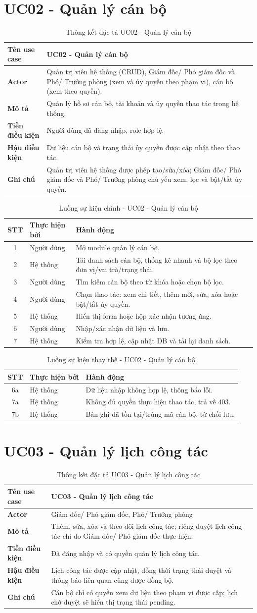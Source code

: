 \documentclass[18pt,a4paper]{report}
\newcommand{\specinfo}[6]{
\begin{table}[H]
\centering
\caption{Thông kết đặc tả #1}
\begin{tabularx}{\textwidth}{|>{\raggedright\arraybackslash}p{3.2cm}|X|}
\hline
\textbf{Tên use case} & #1 \\ \hline
\textbf{Actor} & #2 \\ \hline
\textbf{Mô tả} & #3 \\ \hline
\textbf{Tiền điều kiện} & #4 \\ \hline
\textbf{Hậu điều kiện} & #5 \\ \hline
\textbf{Ghi chú} & #6 \\ \hline
\end{tabularx}
\end{table}
}
\newcommand{\mainflowtable}[1]{
\begin{table}[H]
\centering
\caption{Luồng sự kiện chính - #1}
\begin{tabularx}{\textwidth}{|c|>{\raggedright\arraybackslash}p{3cm}|X|}
\hline
\textbf{STT} & \textbf{Thực hiện bởi} & \textbf{Hành động} \\ \hline
}
\newcommand{\altflowtable}[1]{
\begin{table}[H]
\centering
\caption{Luồng sự kiện thay thế - #1}
\begin{tabularx}{\textwidth}{|c|>{\raggedright\arraybackslash}p{3cm}|X|}
\hline
\textbf{STT} & \textbf{Thực hiện bởi} & \textbf{Hành động} \\ \hline
}
\begin{document}
\section{UC02 - Quản lý cán bộ}
\specinfo
{UC02 - Quản lý cán bộ}
{Quản trị viên hệ thống (CRUD), Giám đốc/ Phó giám đốc và Phó/ Trưởng phòng (xem và ủy quyền theo phạm vi), cán bộ (xem theo quyền).}
{Quản lý hồ sơ cán bộ, tài khoản và ủy quyền thao tác trong hệ thống.}
{Người dùng đã đăng nhập, role hợp lệ.}
{Dữ liệu cán bộ và trạng thái ủy quyền được cập nhật theo thao tác.}
{Quản trị viên hệ thống được phép tạo/sửa/xóa; Giám đốc/ Phó giám đốc và Phó/ Trưởng phòng chủ yếu xem, lọc và bật/tắt ủy quyền.}

\mainflowtable{UC02 - Quản lý cán bộ}
1 & Người dùng & Mở module quản lý cán bộ. \\ \hline
2 & Hệ thống & Tải danh sách cán bộ, thống kê nhanh và bộ lọc theo đơn vị/vai trò/trạng thái. \\ \hline
3 & Người dùng & Tìm kiếm cán bộ theo từ khóa hoặc chọn bộ lọc. \\ \hline
4 & Người dùng & Chọn thao tác: xem chi tiết, thêm mới, sửa, xóa hoặc bật/tắt ủy quyền. \\ \hline
5 & Hệ thống & Hiển thị form hoặc hộp xác nhận tương ứng. \\ \hline
6 & Người dùng & Nhập/xác nhận dữ liệu và lưu. \\ \hline
7 & Hệ thống & Kiểm tra hợp lệ, cập nhật DB và tải lại danh sách. \\ \hline
\end{tabularx}
\end{table}

\altflowtable{UC02 - Quản lý cán bộ}
6a & Hệ thống & Dữ liệu nhập không hợp lệ, thông báo lỗi. \\ \hline
7a & Hệ thống & Không đủ quyền thực hiện thao tác, trả về 403. \\ \hline
7b & Hệ thống & Bản ghi đã tồn tại/trùng mã cán bộ, từ chối lưu. \\ \hline
\end{tabularx}
\end{table}

\section{UC03 - Quản lý lịch công tác}
\specinfo
{UC03 - Quản lý lịch công tác}
{Giám đốc/ Phó giám đốc, Phó/ Trưởng phòng}
{Thêm, sửa, xóa và theo dõi lịch công tác; riêng duyệt lịch công tác chỉ do Giám đốc/ Phó giám đốc thực hiện.}
{Đã đăng nhập và có quyền quản lý lịch công tác.}
{Lịch công tác được cập nhật, đồng thời trạng thái duyệt và thông báo liên quan cũng được đồng bộ.}
{Cán bộ chỉ có quyền xem dữ liệu theo phạm vi được cấp; lịch chờ duyệt sẽ hiển thị trạng thái pending.}
\end{document}

